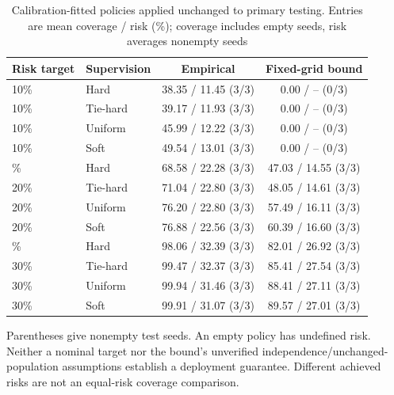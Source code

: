 \begin{table}[t]
\caption{Calibration-fitted policies applied unchanged to primary testing. Entries are mean coverage / risk (\%); coverage includes empty seeds, risk averages nonempty seeds}\label{tab:policies}
\centering\begin{tabular}{llcc}\toprule
Risk target & Supervision & Empirical & Fixed-grid bound\\\midrule
10\% & Hard & 38.35 / 11.45 (3/3) & 0.00 / -- (0/3)\\
10\% & Tie-hard & 39.17 / 11.93 (3/3) & 0.00 / -- (0/3)\\
10\% & Uniform & 45.99 / 12.22 (3/3) & 0.00 / -- (0/3)\\
10\% & Soft & 49.54 / 13.01 (3/3) & 0.00 / -- (0/3)\\
\addlinespace
20\% & Hard & 68.58 / 22.28 (3/3) & 47.03 / 14.55 (3/3)\\
20\% & Tie-hard & 71.04 / 22.80 (3/3) & 48.05 / 14.61 (3/3)\\
20\% & Uniform & 76.20 / 22.80 (3/3) & 57.49 / 16.11 (3/3)\\
20\% & Soft & 76.88 / 22.56 (3/3) & 60.39 / 16.60 (3/3)\\
\addlinespace
30\% & Hard & 98.06 / 32.39 (3/3) & 82.01 / 26.92 (3/3)\\
30\% & Tie-hard & 99.47 / 32.37 (3/3) & 85.41 / 27.54 (3/3)\\
30\% & Uniform & 99.94 / 31.46 (3/3) & 88.41 / 27.11 (3/3)\\
30\% & Soft & 99.91 / 31.07 (3/3) & 89.57 / 27.01 (3/3)\\
\bottomrule\end{tabular}\par
\smallskip\par\footnotesize Parentheses give nonempty test seeds. An empty policy has undefined risk. Neither a nominal target nor the bound's unverified independence/unchanged-population assumptions establish a deployment guarantee. Different achieved risks are not an equal-risk coverage comparison.
\end{table}
